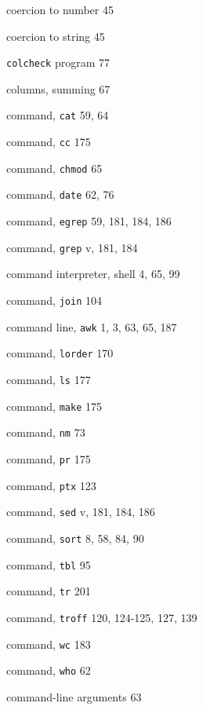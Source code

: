 \begin{multicols}{3}
\hangindent=3pc  coercion to number 45

\hangindent=3pc  coercion to string 45

\hangindent=3pc  \verb'colcheck' program 77

\hangindent=3pc  columns, summing 67

\hangindent=3pc  command, \verb'cat' 59, 64

\hangindent=3pc  command, \verb'cc' 175

\hangindent=3pc  command, \verb'chmod' 65

\hangindent=3pc  command, \verb'date' 62, 76

\hangindent=3pc  command, \verb'egrep' 59, 181, 184,  186

\hangindent=3pc  command, \verb'grep' v, 181, 184

\hangindent=3pc  command interpreter, shell 4, 65,  99

\hangindent=3pc  command, \verb'join' 104

\hangindent=3pc  command line, \verb'awk' 1, 3, 63, 65, 187

\hangindent=3pc  command, \verb'lorder' 170

\hangindent=3pc  command, \verb'ls' 177

\hangindent=3pc  command, \verb'make' 175

\hangindent=3pc  command, \verb'nm' 73

\hangindent=3pc  command, \verb'pr' 175

\hangindent=3pc  command, \verb'ptx' 123

\hangindent=3pc  command, \verb'sed' v, 181, 184, 186

\hangindent=3pc  command, \verb'sort' 8, 58, 84, 90

\hangindent=3pc  command, \verb'tbl' 95

\hangindent=3pc  command, \verb'tr' 201

\hangindent=3pc  command, \verb'troff' 120, 124-125, 127, 139

\hangindent=3pc  command, \verb'wc' 183


\hangindent=3pc  command, \verb'who' 62

\hangindent=3pc  command-line arguments 63


\end{multicols}
